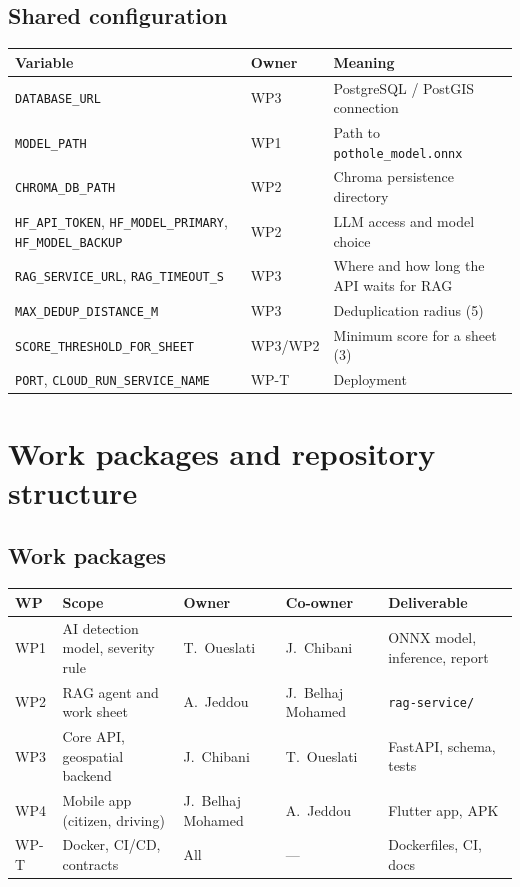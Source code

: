 \documentclass[11pt,a4paper,oneside]{report}
\begin{document}
\section{Shared configuration}
\begin{longtable}{@{}L{5.6cm}L{1.6cm}L{6.8cm}@{}}
\toprule\textbf{Variable} & \textbf{Owner} & \textbf{Meaning}\\\midrule\endhead
\texttt{DATABASE\_URL} & WP3 & PostgreSQL / PostGIS connection\\
\texttt{MODEL\_PATH} & WP1 & Path to \texttt{pothole\_model.onnx}\\
\texttt{CHROMA\_DB\_PATH} & WP2 & Chroma persistence directory\\
\texttt{HF\_API\_TOKEN}, \texttt{HF\_MODEL\_PRIMARY}, \texttt{HF\_MODEL\_BACKUP} & WP2 & LLM access and model choice\\
\texttt{RAG\_SERVICE\_URL}, \texttt{RAG\_TIMEOUT\_S} & WP3 & Where and how long the API waits for RAG\\
\texttt{MAX\_DEDUP\_DISTANCE\_M} & WP3 & Deduplication radius (5)\\
\texttt{SCORE\_THRESHOLD\_FOR\_SHEET} & WP3/WP2 & Minimum score for a sheet (3)\\
\texttt{PORT}, \texttt{CLOUD\_RUN\_SERVICE\_NAME} & WP-T & Deployment\\\bottomrule
\end{longtable}

\chapter{Work packages and repository structure}
\section{Work packages}
\begin{longtable}{@{}L{1.4cm}L{4.2cm}L{2.8cm}L{2.8cm}L{2.8cm}@{}}
\toprule\textbf{WP} & \textbf{Scope} & \textbf{Owner} & \textbf{Co-owner} & \textbf{Deliverable}\\\midrule\endhead
WP1 & AI detection model, severity rule & T.~Oueslati & J.~Chibani & ONNX model, inference, report\\
WP2 & RAG agent and work sheet & A.~Jeddou & J.~Belhaj Mohamed & \texttt{rag-service/}\\
WP3 & Core API, geospatial backend & J.~Chibani & T.~Oueslati & FastAPI, schema, tests\\
WP4 & Mobile app (citizen, driving) & J.~Belhaj Mohamed & A.~Jeddou & Flutter app, APK\\
WP-T & Docker, CI/CD, contracts & All & --- & Dockerfiles, CI, docs\\\bottomrule
\end{longtable}
\end{document}
